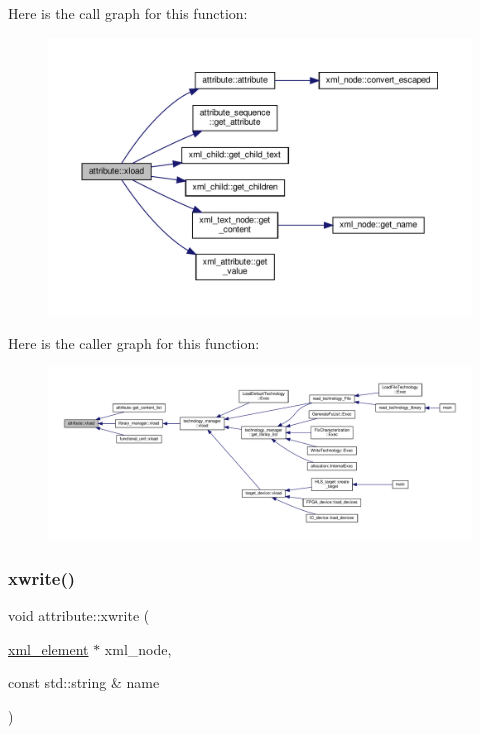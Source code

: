 Here is the call graph for this function\+:
\nopagebreak
\begin{figure}[H]
\begin{center}
\leavevmode
\includegraphics[width=350pt]{d9/d18/structattribute_a6566479d56d67782449458532846cfc3_cgraph}
\end{center}
\end{figure}
Here is the caller graph for this function\+:
\nopagebreak
\begin{figure}[H]
\begin{center}
\leavevmode
\includegraphics[width=350pt]{d9/d18/structattribute_a6566479d56d67782449458532846cfc3_icgraph}
\end{center}
\end{figure}
\mbox{\label{structattribute_a0e1018c57c6411e0994c8d2653ea3593}} 
\subsubsection{\texorpdfstring{xwrite()}{xwrite()}}
{\footnotesize\ttfamily void attribute\+::xwrite (\begin{DoxyParamCaption}\item[{\hyperlink{classxml__element}{xml\+\_\+element} $\ast$}]{xml\+\_\+node,  }\item[{const std\+::string \&}]{name }\end{DoxyParamCaption})}



